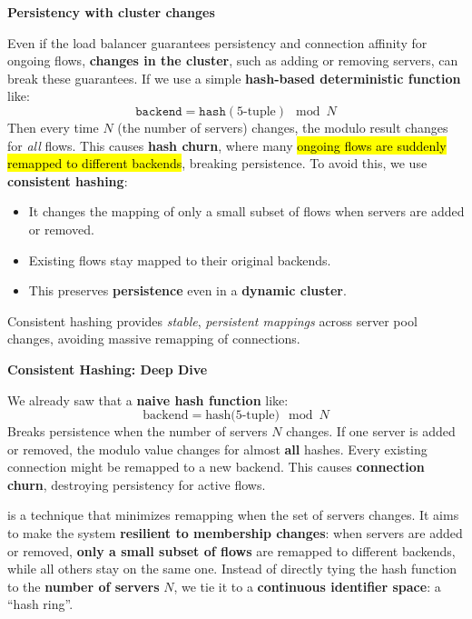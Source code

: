 \highspace
\begin{flushleft}
    \textcolor{Red2}{ \textbf{Persistency with cluster changes}}
\end{flushleft}
Even if the load balancer guarantees persistency and connection affinity for ongoing flows, \textbf{changes in the cluster}, such as adding or removing servers, can break these guarantees. If we use a simple \textbf{hash-based deterministic function} like:
\begin{equation*}
    \texttt{backend} = \texttt{hash}\left(\text{5-tuple}\right) \mod N
\end{equation*}
Then every time $N$ (the number of servers) changes, the modulo result changes for \emph{all} flows. \textcolor{Red2}{} This causes \textbf{hash churn}, where many \hl{ongoing flows are suddenly remapped to different backends}, breaking persistence. \textcolor{Green3}{} To avoid this, we use \textbf{consistent hashing}:
\begin{itemize}
    \item It changes the mapping of only a small subset of flows when servers are added or removed.
    \item Existing flows stay mapped to their original backends.
    \item This preserves \textbf{persistence} even in a \textbf{dynamic cluster}.
\end{itemize}
Consistent hashing provides \emph{stable}, \emph{persistent mappings} across server pool changes, avoiding massive remapping of connections.

\highspace
\begin{flushleft}
    \textcolor{Green3}{ \textbf{Consistent Hashing: Deep Dive}}
\end{flushleft}
We already saw that a \textbf{naive hash function} like:
\begin{equation*}
    \text{backend} = \text{hash(5-tuple)} \mod N
\end{equation*}
Breaks persistence when the number of servers $N$ changes. If one server is added or removed, the modulo value changes for almost \textbf{all} hashes. Every existing connection might be remapped to a new backend. This causes \textbf{connection churn}, destroying persistency for active flows.

\highspace
{} is a technique that minimizes remapping when the set of servers changes. It aims to make the system \textbf{resilient to membership changes}: when servers are added or removed, \textbf{only a small subset of flows} are remapped to different backends, while all others stay on the same one. Instead of directly tying the hash function to the \textbf{number of servers} $N$, we tie it to a \textbf{continuous identifier space}: a ``hash ring''.

